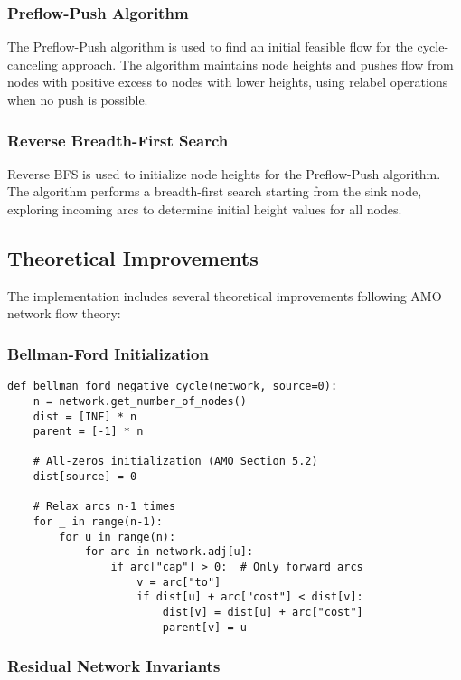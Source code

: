 \documentclass[12pt,a4paper]{article}
\begin{document}
\subsubsection{Preflow-Push Algorithm}
The Preflow-Push algorithm is used to find an initial feasible flow for the cycle-canceling approach. The algorithm maintains node heights and pushes flow from nodes with positive excess to nodes with lower heights, using relabel operations when no push is possible.

\subsubsection{Reverse Breadth-First Search}
Reverse BFS is used to initialize node heights for the Preflow-Push algorithm. The algorithm performs a breadth-first search starting from the sink node, exploring incoming arcs to determine initial height values for all nodes.

\subsection{Theoretical Improvements}

The implementation includes several theoretical improvements following AMO network flow theory:

\subsubsection{Bellman-Ford Initialization}
\begin{lstlisting}[caption=Proper Bellman-Ford Implementation]
def bellman_ford_negative_cycle(network, source=0):
    n = network.get_number_of_nodes()
    dist = [INF] * n
    parent = [-1] * n
    
    # All-zeros initialization (AMO Section 5.2)
    dist[source] = 0
    
    # Relax arcs n-1 times
    for _ in range(n-1):
        for u in range(n):
            for arc in network.adj[u]:
                if arc["cap"] > 0:  # Only forward arcs
                    v = arc["to"]
                    if dist[u] + arc["cost"] < dist[v]:
                        dist[v] = dist[u] + arc["cost"]
                        parent[v] = u
\end{lstlisting}

\subsubsection{Residual Network Invariants}
\end{document}
